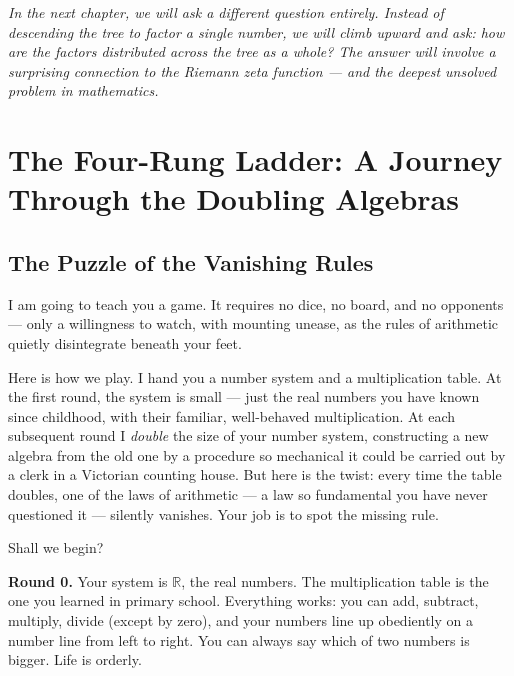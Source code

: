 \documentclass[11pt,openright,twoside]{book}
\theoremstyle{definition}
\begin{document}
\bigskip


\textit{In the next chapter, we will ask a different question entirely. Instead of descending the tree to factor a single number, we will climb upward and ask: how are the factors distributed across the tree as a whole? The answer will involve a surprising connection to the Riemann zeta function --- and the deepest unsolved problem in mathematics.}

\clearpage


\chapter{The Four-Rung Ladder: A Journey Through the Doubling Algebras}
\label{ch:9}



\bigskip


\section{The Puzzle of the Vanishing Rules}

I am going to teach you a game. It requires no dice, no board, and no opponents --- only a willingness to watch, with mounting unease, as the rules of arithmetic quietly disintegrate beneath your feet.

Here is how we play. I hand you a number system and a multiplication table. At the first round, the system is small --- just the real numbers you have known since childhood, with their familiar, well-behaved multiplication. At each subsequent round I \textit{double} the size of your number system, constructing a new algebra from the old one by a procedure so mechanical it could be carried out by a clerk in a Victorian counting house. But here is the twist: every time the table doubles, one of the laws of arithmetic --- a law so fundamental you have never questioned it --- silently vanishes. Your job is to spot the missing rule.

Shall we begin?

\textbf{Round 0.} Your system is $\mathbb{R}$, the real numbers. The multiplication table is the one you learned in primary school. Everything works: you can add, subtract, multiply, divide (except by zero), and your numbers line up obediently on a number line from left to right. You can always say which of two numbers is bigger. Life is orderly.
\end{document}
